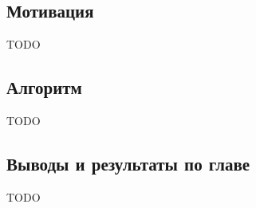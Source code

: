 \documentclass[../diploma.tex]{subfiles}
\begin{document}
\label{sec:3}

\subsection{Мотивация}

TODO

\subsection{Алгоритм}

TODO

\subsection{Выводы и результаты по главе}

TODO
\end{document}
